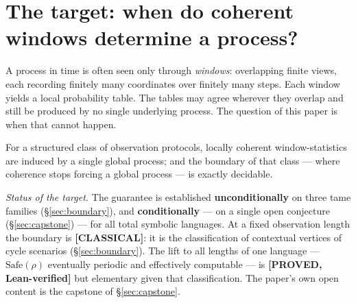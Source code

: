 %

\section{The target: when do coherent windows determine a process?}\label{sec:target}

A process in time is often seen only through \emph{windows}: overlapping finite
views, each recording finitely many coordinates over finitely many steps. Each
window yields a local probability table. The tables may agree wherever they
overlap and still be produced by no single underlying process. The question of
this paper is when that cannot happen.

\begin{namedgoal}\label{goal:recon}
For a structured class of observation protocols, locally coherent window-statistics
are induced by a single global process; and the boundary of that class ---
where coherence stops forcing a global process --- is exactly decidable.
\end{namedgoal}

\noindent\emph{Status of the target.} The guarantee is established
\textbf{unconditionally} on three tame families (\S\ref{sec:boundary}), and
\textbf{conditionally} --- on a single open conjecture (\S\ref{sec:capstone}) ---
for all total symbolic languages. At a fixed observation length the boundary is
\textbf{[CLASSICAL]}: it is the classification of contextual vertices of cycle
scenarios (\S\ref{sec:boundary}). The lift to all lengths of one language
--- $\mathrm{Safe}(\rho)$ eventually periodic and effectively computable --- is
\textbf{[PROVED, Lean-verified]} but elementary given that classification. The
paper's own open content is the capstone of \S\ref{sec:capstone}.

